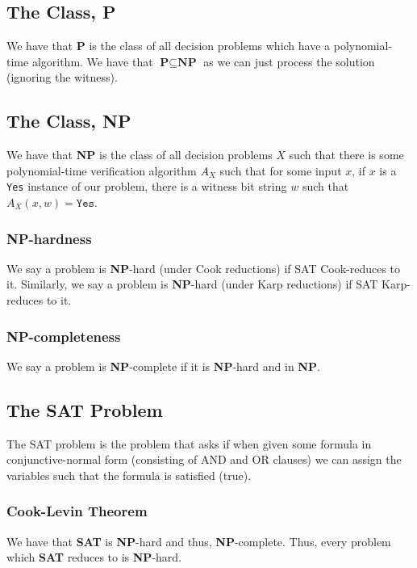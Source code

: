 \subsection{The Class, \textbf{P}}

We have that \textbf{P} is the class of all decision problems which have a polynomial-time
algorithm. We have that $\textbf{P} \subseteq \textbf{NP}$ as we can just process the solution
(ignoring the witness).

\subsection{The Class, \textbf{NP}}

We have that \textbf{NP} is the class of all decision problems $X$ such that there is some
polynomial-time verification algorithm $A_X$ such that for some input $x$, 
if $x$ is a \texttt{Yes} instance of our problem, there is a witness bit string $w$
such that $A_X(x, w) = \texttt{Yes}$.

\subsubsection{\textbf{NP}-hardness}

We say a problem is \textbf{NP}-hard (under Cook reductions) if SAT Cook-reduces to it.
Similarly, we say a problem is \textbf{NP}-hard (under Karp reductions) if SAT Karp-reduces to it.

\subsubsection{\textbf{NP}-completeness}

We say a problem is \textbf{NP}-complete if it is \textbf{NP}-hard and in \textbf{NP}.

\subsection{The SAT Problem}

The SAT problem is the problem that asks if when given some formula in conjunctive-normal form
(consisting of AND and OR clauses) we can assign the variables such that the formula is 
satisfied (true).

\subsubsection{Cook-Levin Theorem}

We have that \textbf{SAT} is \textbf{NP}-hard and thus, \textbf{NP}-complete.
Thus, every problem which \textbf{SAT} reduces to is \textbf{NP}-hard.

